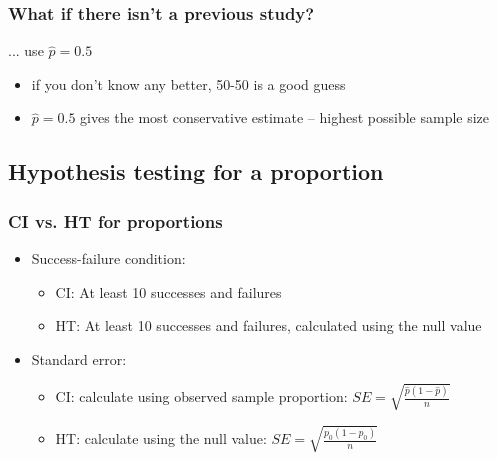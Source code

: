 \documentclass[notes,11pt, aspectratio=169]{beamer}
\begin{document}

\begin{frame}
\frametitle{What if there isn't a previous study?}

... use $\hat{p} = 0.5$

\vspace{1cm}

\pause

\begin{itemize}
\item if you don't know any better, 50-50 is a good guess
\pause
\item $\hat{p} = 0.5$ gives the most conservative estimate -- highest possible sample size
\end{itemize}

\end{frame}


\subsection{Hypothesis testing for a proportion}


\begin{frame}
\frametitle{CI vs. HT for proportions}

\begin{itemize}

\item Success-failure condition:
\begin{itemize}
\item CI: At least 10  successes and failures
\item HT: At least 10  successes and failures, calculated using the null value
\end{itemize}

\item Standard error:
\begin{itemize}
\item CI: calculate using observed sample proportion: $SE = \sqrt{\frac{\hat{p}(1-\hat{p})}{n}}$
\item HT: calculate using the null value: $SE = \sqrt{\frac{p_0(1-p_0)}{n}}$
\end{itemize}

\end{itemize}

\end{frame}
\end{document}
